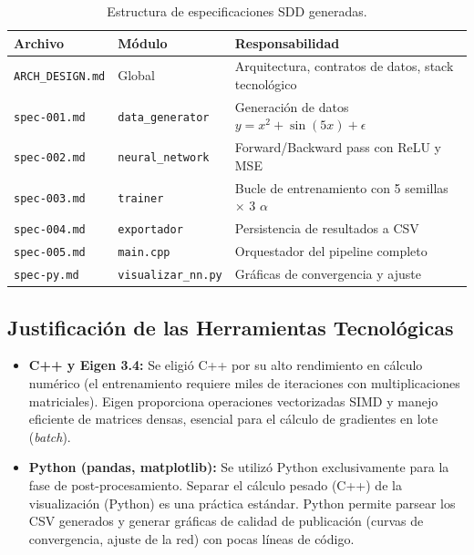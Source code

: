 \documentclass[12pt,a4paper]{article}
\theoremstyle{definition}
\begin{document}
\begin{table}[H]
\centering
\caption{Estructura de especificaciones SDD generadas.}
\label{tab:specs}
\begin{tabular}{@{}llp{7cm}@{}}
\toprule
\textbf{Archivo} & \textbf{M\'{o}dulo} & \textbf{Responsabilidad} \\ \midrule
\texttt{ARCH\_DESIGN.md} & Global & Arquitectura, contratos de datos, stack tecnol\'{o}gico \\
\texttt{spec-001.md} & \texttt{data\_generator} & Generaci\'{o}n de datos $y = x^2 + \sin(5x) + \epsilon$ \\
\texttt{spec-002.md} & \texttt{neural\_network} & Forward/Backward pass con ReLU y MSE \\
\texttt{spec-003.md} & \texttt{trainer} & Bucle de entrenamiento con 5 semillas $\times$ 3 $\alpha$ \\
\texttt{spec-004.md} & \texttt{exportador} & Persistencia de resultados a CSV \\
\texttt{spec-005.md} & \texttt{main.cpp} & Orquestador del pipeline completo \\
\texttt{spec-py.md} & \texttt{visualizar\_nn.py} & Gr\'{a}ficas de convergencia y ajuste \\ \bottomrule
\end{tabular}
\end{table}

\subsection{Justificaci\'{o}n de las Herramientas Tecnol\'{o}gicas}

\begin{itemize}
    \item \textbf{C++ y Eigen 3.4:} Se eligi\'{o} C++ por su alto rendimiento en c\'{a}lculo num\'{e}rico (el entrenamiento requiere miles de iteraciones con multiplicaciones matriciales). Eigen proporciona operaciones vectorizadas SIMD y manejo eficiente de matrices densas, esencial para el c\'{a}lculo de gradientes en lote (\textit{batch}).

    
    \item \textbf{Python (pandas, matplotlib):} Se utiliz\'{o} Python exclusivamente para la fase de post-procesamiento. Separar el c\'{a}lculo pesado (C++) de la visualizaci\'{o}n (Python) es una pr\'{a}ctica est\'{a}ndar. Python permite parsear los CSV generados y generar gr\'{a}ficas de calidad de publicaci\'{o}n (curvas de convergencia, ajuste de la red) con pocas l\'{i}neas de c\'{o}digo.
\end{itemize}
\end{document}
